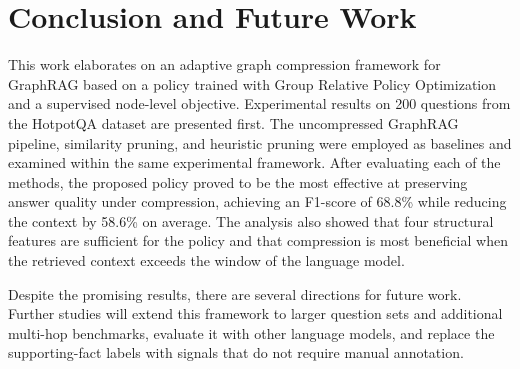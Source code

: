 \documentclass[conference]{IEEEtran}
\begin{document}
\section{Conclusion and Future Work}\label{sec:con}

This work elaborates on an adaptive graph compression framework for GraphRAG based on a policy trained with Group Relative Policy Optimization and a supervised node-level objective. Experimental results on 200 questions from the HotpotQA dataset are presented first. The uncompressed GraphRAG pipeline, similarity pruning, and heuristic pruning were employed as baselines and examined within the same experimental framework. After evaluating each of the methods, the proposed policy proved to be the most effective at preserving answer quality under compression, achieving an F1-score of 68.8\% while reducing the context by 58.6\% on average. The analysis also showed that four structural features are sufficient for the policy and that compression is most beneficial when the retrieved context exceeds the window of the language model.

Despite the promising results, there are several directions for future work. Further studies will extend this framework to larger question sets and additional multi-hop benchmarks, evaluate it with other language models, and replace the supporting-fact labels with signals that do not require manual annotation.




\balance
\end{document}
